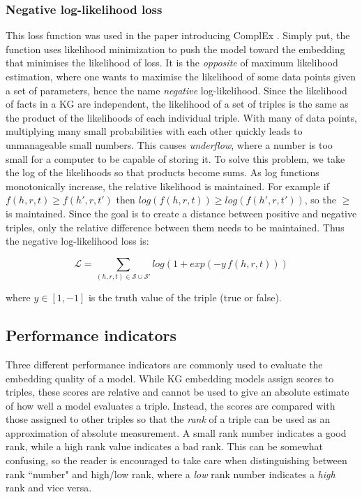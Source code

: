 \subsubsection{Negative log-likelihood loss}
This loss function was used in the paper introducing ComplEx \cite{complEx}. Simply put, the function uses likelihood minimization to push the model toward the embedding that minimises the likelihood of loss. It is the \textit{opposite} of maximum likelihood estimation, where one wants to maximise the likelihood of some data points given a set of parameters, hence the name \textit{negative} log-likelihood.
Since the likelihood of facts in a KG are independent, the likelihood of a set of triples is the same as the product of the likelihoods of each individual triple. With many of data points, multiplying many small probabilities with each other quickly leads to unmanageable small numbers. This causes \textit{underflow}, where a number is too small for a computer to be capable of storing it. To solve this problem, we take the log of the likelihoods so that products become sums. As log functions monotonically increase, the relative likelihood is maintained. For example if $f(h,r,t) \geq f(h', r, t')$ then $log(f(h,r,t)) \geq log(f(h', r, t'))$, so the $\geq$ is maintained. Since the goal is to create a distance between positive and negative triples, only the relative difference between them needs to be maintained. Thus the negative log-likelihood loss is:

\[\mathcal{L}=\sum_{(h, r, t) \in \mathcal{S} \cup \mathcal{S'}}log(1+exp(-y \, f(h, r, t)))\]

where $y\in [1, -1]$ is the truth value of the triple (true or false).



    
\subsection{Performance indicators}
\label{Performance_indicators}
Three different performance indicators are commonly used to evaluate the embedding quality of a model. While KG embedding models assign scores to triples, these scores are relative and cannot be used to give an absolute estimate of how well a model evaluates a triple. Instead, the scores are compared with those assigned to other triples so that the \textit{rank} of a triple can be used as an approximation of absolute measurement. A small rank number indicates a good rank, while a high rank value indicates a bad rank. This can be somewhat confusing, so the reader is encouraged to take care when distinguishing between rank ``number" and high/low rank, where a \textit{low} rank number indicates a \textit{high} rank and vice versa.

